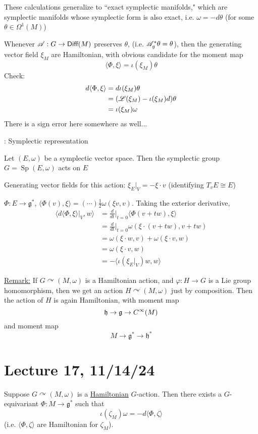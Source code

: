 \documentclass[x11names,reqno,14pt]{extarticle}
\newcommand{\mk}[1]{\mathfrak{#1}}
\newcommand{\g}{\mk{g}}
\newcommand{\h}{\mk{h}}
\newcommand{\dd}[2]{\frac{d#1}{d#2}}
\newcommand{\spew}{\Sp(E,\omega)}
\DeclareMathOperator{\Sp}{Sp}
\begin{document}
These calculations generalize to ``exact symplectic manifolds," which are symplectic manifolds whose symplectic form is also exact, i.e. $\omega = -d\theta$ (for some $\theta \in \Omega^1(M)$)

Whenever $\mathscr{A}:G \to {{\text{\sffamily {Diff}}}}(M)$ preserves $\theta$, (i.e. $\mathscr{A}^*_g\theta = \theta$), then the generating vector field $\xi_M$ are Hamiltonian, with obvious candidate for the moment map 
\[
\langle\Phi,\xi\rangle = \iota(\xi_M)\theta
\]
Check: 
\begin{align*}
d\langle\Phi,\xi\rangle & = d\iota(\xi_M)\theta \\
& = (\mathscr{L}(\xi_M)-\iota(\xi_M)d)\theta \\
& = \iota(\xi_M)\omega
\end{align*}
There is a sign error here somewhere as well...

\exm: Symplectic representation

Let $(E,\omega)$ be a symplectic vector space. Then the symplectic group $G = \spew$ acts on $E$

Generating vector fields for this action: $\xi_E|_V = -\xi\cdot v$ (identifying $T_vE \cong E$)

$\Phi:E\to\g^*$, $\langle \Phi(v),\xi\rangle =(\cdots) \frac12\omega(\xi v, v)$. Taking the exterior derivative, 
\begin{align*}
\langle d \langle \Phi,\xi \rangle |_V,w \rangle & = \dd{}{t}|_{t=0}\langle\Phi(v + tw), \xi \rangle \\
& = \dd{}{t}|_{t=0}\omega(\xi\cdot(v + tw), v + tw) \\
& = \omega(\xi\cdot w, v) + \omega(\xi\cdot v, w) \\
& = \omega(\xi\cdot v, w) \\ 
& = -\langle\iota(\xi_E|_V)w,w\rangle
\end{align*}

\underline{Remark:} If $G\curvearrowright (M,\omega)$ is a Hamiltonian action, and $\varphi:H\to G$ is a Lie group homomorphism, then we get an action $H \curvearrowright (M,\omega)$ just by composition. Then the action of $H$ is again Hamiltonian, with moment map
\[
\h \to \g \to C^\oo(M)
\]
and moment map
\[
M \to \g^* \to \h^*
\]

\section*{Lecture 17, 11/14/24}

Suppose $G \curvearrowright (M,\omega)$ is a \underline{Hamiltonian} $G$-action. Then there exists a $G$-equivariant $\Phi:M\to\g^*$ such that
\[
\iota(\zeta_M)\omega = -d\langle\Phi,\zeta\rangle
\]
(i.e. $\langle \Phi,\zeta\rangle$ are Hamiltonian for $\zeta_M$). 
\end{document}

